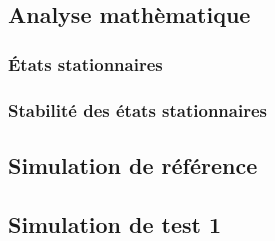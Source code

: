 \subsection{Analyse mathèmatique}
\subsubsection{États stationnaires}
\subsubsection{Stabilité des états stationnaires}

\subsection{Simulation de référence}

\subsection{Simulation de test 1}
